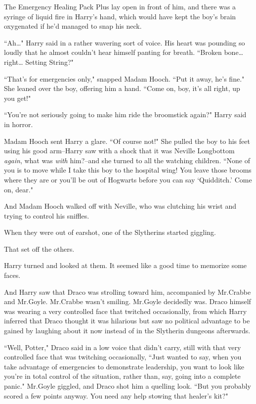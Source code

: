 The Emergency Healing Pack Plus lay open in front of him, and there was a syringe of liquid fire in Harry's hand, which would have kept the boy's brain oxygenated if he'd managed to snap his neck.

``Ah{\ldots}" Harry said in a rather wavering sort of voice. His heart was pounding so loudly that he almost couldn't hear himself panting for breath. ``Broken bone{\ldots} right{\ldots} Setting String?"

``That's for emergencies only," snapped Madam Hooch. ``Put it away, he's fine." She leaned over the boy, offering him a hand. ``Come on, boy, it's all right, up you get!"

``You're not seriously going to make him ride the broomstick again?" Harry said in horror.

Madam Hooch sent Harry a glare. ``Of course not!" She pulled the boy to his feet using his good arm\---Harry saw with a shock that it was Neville Longbottom \emph{again}, what was \emph{with} him?\---and she turned to all the watching children. ``None of you is to move while I take this boy to the hospital wing! You leave those brooms where they are or you'll be out of Hogwarts before you can say `Quidditch.' Come on, dear."

And Madam Hooch walked off with Neville, who was clutching his wrist and trying to control his sniffles.

When they were out of earshot, one of the Slytherins started giggling.

That set off the others.

Harry turned and looked at them. It seemed like a good time to memorize some faces.

And Harry saw that Draco was strolling toward him, accompanied by Mr.\?Crabbe and Mr.\?Goyle. Mr.\?Crabbe wasn't smiling. Mr.\?Goyle decidedly was. Draco himself was wearing a very controlled face that twitched occasionally, from which Harry inferred that Draco thought it was hilarious but saw no political advantage to be gained by laughing about it now instead of in the Slytherin dungeons afterwards.

``Well, Potter," Draco said in a low voice that didn't carry, still with that very controlled face that was twitching occasionally, ``Just wanted to say, when you take advantage of emergencies to demonstrate leadership, you want to look like you're in total control of the situation, rather than, say, going into a complete panic." Mr.\?Goyle giggled, and Draco shot him a quelling look. ``But you probably scored a few points anyway. You need any help stowing that healer's kit?"


